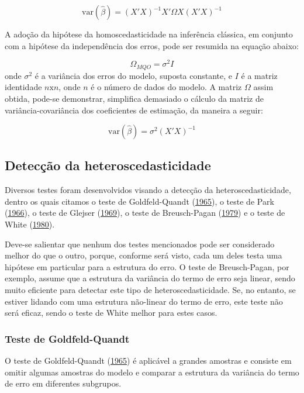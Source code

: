 \documentclass[a4paper, 12pt]{article}
\begin{document}
\[\mathrm{var}(\hat{\beta})=(X'X)^{-1}X' \Omega X(X'X)^{-1}\]

A adoção da hipótese da homoscedasticidade na inferência clássica, em
conjunto com a hipótese da independência dos erros, pode ser resumida na
equação abaixo:

\[\Omega_{MQO}=\sigma^2I\] onde \(\sigma^2\) é a variância dos erros do
modelo, suposta constante, e \(I\) é a matriz identidade
\(n \text{x}n\), onde \(n\) é o número de dados do modelo. A matriz
\(\Omega\) assim obtida, pode-se demonstrar, simplifica demasiado o
cálculo da matriz de variância-covariância dos coeficientes de
estimação, da maneira a seguir:

\[\mathrm{var} (\hat{\beta})=\sigma^2(X'X)^{-1}\]

\hypertarget{deteccao-da-heteroscedasticidade}{%
\subsection{Detecção da
heteroscedasticidade}\label{deteccao-da-heteroscedasticidade}}

Diversos testes foram desenvolvidos visando a detecção da
heteroscedasticidade, dentro os quais citamos o teste de Goldfeld-Quandt
(\protect\hyperlink{ref-GQ}{1965}), o teste de Park
(\protect\hyperlink{ref-Park}{1966}), o teste de Glejser
(\protect\hyperlink{ref-glejser}{1969}), o teste de Breusch-Pagan
(\protect\hyperlink{ref-BP}{1979}) e o teste de White
(\protect\hyperlink{ref-white1980}{1980}).

Deve-se salientar que nenhum dos testes mencionados pode ser considerado
melhor do que o outro, porque, conforme será visto, cada um deles testa
uma hipótese em particular para a estrutura do erro. O teste de
Breusch-Pagan, por exemplo, assume que a estrutura da variância do termo
de erro seja linear, sendo muito eficiente para detectar este tipo de
heteroscedasticidade. Se, no entanto, se estiver lidando com uma
estrutura não-linear do termo de erro, este teste não será eficaz, sendo
o teste de White melhor para estes casos.

\hypertarget{teste-de-goldfeld-quandt}{%
\subsubsection{Teste de
Goldfeld-Quandt}\label{teste-de-goldfeld-quandt}}

O teste de Goldfeld-Quandt (\protect\hyperlink{ref-GQ}{1965}) é
aplicável a grandes amostras e consiste em omitir algumas amostras do
modelo e comparar a estrutura da variância do termo de erro em
diferentes subgrupos.
\end{document}
